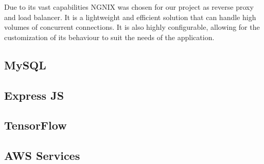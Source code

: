 Due to its vast capabilities NGNIX was chosen for our project as reverse proxy and load balancer. It is a lightweight and efficient solution that can handle high volumes of concurrent connections. It is also highly configurable, allowing for the customization of its behaviour to suit the needs of the application.

\subsection{MySQL}



\subsection{Express JS}

\subsection{TensorFlow}

\subsection{AWS Services}

